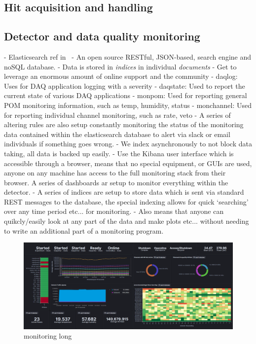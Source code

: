 \subsection{Hit acquisition and handling} %
\label{sec:daq_soft_hits} %

\subsection{Detector and data quality monitoring} %
\label{sec:daq_soft_monitor} %

- Elasticsearch ref in~\cite{elastic2020}
- An open source RESTful, JSON-based, search engine and noSQL database.
- Data is stored in \emph{indices} in individual \emph{documents}
- Get to leverage an enormous amount of online support and the community
- daqlog: Uses for DAQ application logging with a severity
- daqstate: Used to report the current state of various DAQ applications
- monpom: Used for reporting general POM monitoring information, such as temp, humidity, status
- monchannel: Used for reporting individual channel monitoring, such as rate, veto
- A series of altering rules are also setup constantly monitoring the status of the monitoring
data contained within the elasticsearch database to alert via slack or email individuals if something goes wrong.
- We index asynchronously to not block data taking, all data is backed up easily.
- Use the Kibana user interface which is accessible through a browser, means that no special
equipment, or GUIs are used, anyone on any machine has access to the full monitoring stack from
their browser. A series of dashboards ar setup to monitor everything within the detector.
- A series of indices are setup to store data which is sent via standard REST messages to the
database, the special indexing allows for quick `searching' over any time period etc... for
monitoring.
- Also means that anyone can quikcly/easily look at any part of the data and make plots etc...
without needing to write an additional part of a monitoring program.

\begin{figure} %
    \includegraphics[width=\textwidth]{diagrams/5-daq/monitoring.png}
    \caption[monitoring short]
    {monitoring long}
    \label{fig:monitoring}
\end{figure}